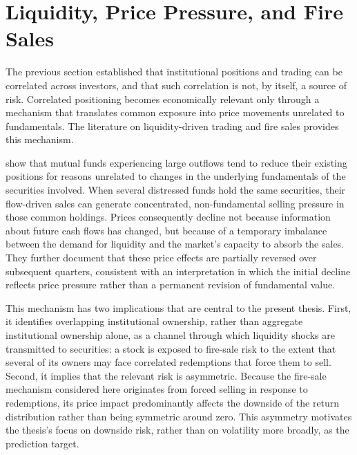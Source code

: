 \section{Liquidity, Price Pressure, and Fire Sales}
\label{sec:liquidity_fire_sales}

The previous section established that institutional positions and trading can be correlated across investors, and that such correlation is not, by itself, a source of risk. Correlated positioning becomes economically relevant only through a mechanism that translates common exposure into price movements unrelated to fundamentals. The literature on liquidity-driven trading and fire sales provides this mechanism.

\textcite{coval2007asset} show that mutual funds experiencing large outflows tend to reduce their existing positions for reasons unrelated to changes in the underlying fundamentals of the securities involved. When several distressed funds hold the same securities, their flow-driven sales can generate concentrated, non-fundamental selling pressure in those common holdings. Prices consequently decline not because information about future cash flows has changed, but because of a temporary imbalance between the demand for liquidity and the market's capacity to absorb the sales. They further document that these price effects are partially reversed over subsequent quarters, consistent with an interpretation in which the initial decline reflects price pressure rather than a permanent revision of fundamental value.

This mechanism has two implications that are central to the present thesis. First, it identifies overlapping institutional ownership, rather than aggregate institutional ownership alone, as a channel through which liquidity shocks are transmitted to securities: a stock is exposed to fire-sale risk to the extent that several of its owners may face correlated redemptions that force them to sell. Second, it implies that the relevant risk is asymmetric. Because the fire-sale mechanism considered here originates from forced selling in response to redemptions, its price impact predominantly affects the downside of the return distribution rather than being symmetric around zero. This asymmetry motivates the thesis's focus on downside risk, rather than on volatility more broadly, as the prediction target.